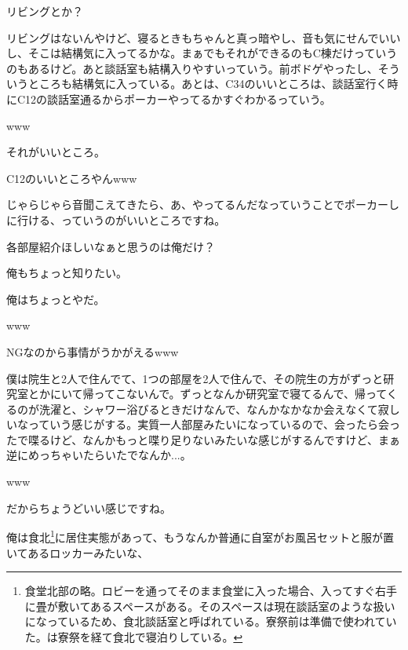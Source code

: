 \begin{multicols}{2}
  
リビングとか？

  
リビングはないんやけど、寝るときもちゃんと真っ暗やし、音も気にせんでいいし、そこは結構気に入ってるかな。まぁでもそれができるのもC棟だけっていうのもあるけど。あと談話室も結構入りやすいっていう。前ボドゲやったし、そういうところも結構気に入っている。あとは、C34のいいところは、談話室行く時にC12の談話室通るからポーカーやってるかすぐわかるっていう。

  
www

  
それがいいところ。

  
C12のいいところやんwww

  
じゃらじゃら音聞こえてきたら、あ、やってるんだなっていうことでポーカーしに行ける、っていうのがいいところですね。

  

\vspace{15mm}
\vspace{3mm}

各部屋紹介ほしいなぁと思うのは俺だけ？

  
俺もちょっと知りたい。

  
俺はちょっとやだ。

  
www

  
NGなのから事情がうかがえるwww

  
僕は院生と2人で住んでて、1つの部屋を2人で住んで、その院生の方がずっと研究室とかにいて帰ってこないんで。ずっとなんか研究室で寝てるんで、帰ってくるのが洗濯と、シャワー浴びるときだけなんで、なんかなかなか会えなくて寂しいなっていう感じがする。実質一人部屋みたいになっているので、会ったら会ったで喋るけど、なんかもっと喋り足りないみたいな感じがするんですけど、まぁ逆にめっちゃいたらいたでなんか...。

  
www

  
だからちょうどいい感じですね。

  
俺は食北\footnote{食堂北部の略。ロビーを通ってそのまま食堂に入った場合、入ってすぐ右手に畳が敷いてあるスペースがある。そのスペースは現在談話室のような扱いになっているため、食北談話室と呼ばれている。寮祭前は準備で使われていた。は寮祭を経て食北で寝泊りしている。}に居住実態があって、もうなんか普通に自室がお風呂セットと服が置いてあるロッカーみたいな、


\end{multicols}
